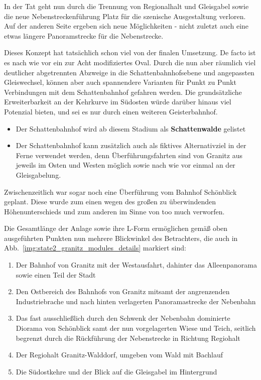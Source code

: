 In der Tat geht nun durch die Trennung von Regionalhalt und Gleisgabel sowie die neue Nebenstreckenf\"uhrung Platz f\"ur die szenische Ausgestaltung verloren.
Auf der anderen Seite ergeben sich neue M\"oglichkeiten - nicht zuletzt auch eine etwas l\"angere Panoramstrecke f\"ur die Nebenstrecke.

\clearpage

Dieses Konzept hat tats\"achlich schon viel von der finalen Umsetzung.
De facto ist es nach wie vor ein zur Acht modifiziertes Oval.
Durch die nun aber r\"aumlich viel deutlicher abgetrennten Abzweige in die Schattenbahnhofsebene und angepassten Gleiswechsel, k\"onnen aber auch spannendere Varianten f\"ur Punkt zu Punkt Verbindungen mit dem Schattenbahnhof gefahren werden.
Die grunds\"atzliche Erweiterbarkeit an der Kehrkurve im S\"udosten w\"urde dar\"uber hinaus viel Potenzial bieten, und sei es nur durch einen weiteren Geisterbahnhof.
\begin{itemize}
	\item Der Schattenbahnhof wird ab diesem Stadium als \textbf{Schattenwalde} gelistet
	\item Der Schattenbahnhof kann zus\"atzlich auch als fiktives Alternativziel in der Ferne verwendet werden, denn \"Uberf\"uhrungsfahrten sind von Granitz aus jeweils im Osten und Westen m\"oglich sowie nach wie vor einmal an der Gleisgabelung.
\end{itemize}
Zwischenzeitlich war sogar noch eine \"Uberf\"uhrung vom Bahnhof Sch\"onblick geplant.
Diese wurde zum einen wegen des gro{\ss}en zu \"uberwindenden H\"ohenunterschieds und zum anderen im Sinne von too much verworfen.

Die Gesamtl\"ange der Anlage sowie ihre L-Form erm\"oglichen gem\"a{\ss} oben ausgef\"uhrten Punkten nun mehrere Blickwinkel des Betrachters, die auch in Abb.~\ref{img:state2_granitz_modules_details} markiert sind:
\begin{enumerate}
	\item Der Bahnhof von Granitz mit der Westausfahrt, dahinter das Alleenpanorama sowie einen Teil der Stadt
	\item Den Ostbereich des Bahnhofs von Granitz mitsamt der angrenzenden Industriebrache und nach hinten verlagerten Panoramastrecke der Nebenbahn
	\item Das fast ausschlie{\ss}lich durch den Schwenk der Nebenbahn dominierte Diorama von Sch\"onblick samt der nun vorgelagerten Wiese und Teich, seitlich begrenzt durch die R\"uckf\"uhrung der Nebenstrecke in Richtung Regiohalt
	\item Der Regiohalt Granitz-Walddorf, umgeben vom Wald mit Bachlauf
	\item Die S\"udostkehre und der Blick auf die Gleisgabel im Hintergrund
\end{enumerate}

